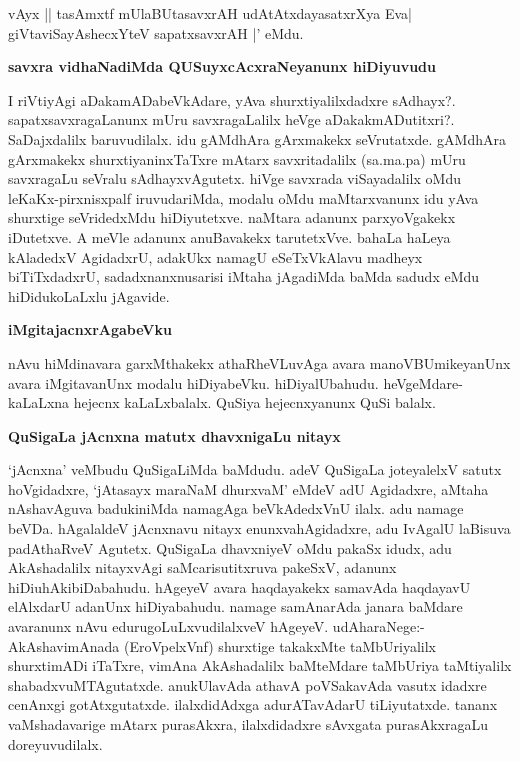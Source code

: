 \begin{shloka}
vAyx || tasAmxtf mUlaBUtasavxrAH udAtAtxdayasatxrXya Eva|\\
giVtaviSayAshecxYteV sapatxsavxrAH |' eMdu.
\end{shloka}

\noindent
\textbf{savxra vidhaNadiMda QUSuyxcAcxraNeyanunx hiDiyuvudu}\label{page122}

I riVtiyAgi aDakamADabeVkAdare, yAva shurxtiyalilxdadxre sAdhayx?. sapatxsavxragaLanunx mUru savxragaLalilx heVge aDakakmADutitxri?. SaDajxdalilx baruvudilalx. idu gAMdhAra gArxmakekx seVrutatxde. gAMdhAra gArxmakekx shurxtiyaninxTaTxre mAtarx savxritadalilx (sa.ma.pa) mUru savxragaLu seVralu sAdhayxvAgutetx. hiVge savxrada viSayadalilx oMdu leKaKx-pirxnisxpalf iruvudariMda, modalu oMdu maMtarxvanunx idu yAva shurxtige seVridedxMdu hiDiyutetxve. naMtara adanunx parxyoVgakekx iDutetxve. A meVle adanunx anuBavakekx tarutetxVve. bahaLa haLeya kAladedxV AgidadxrU, adakUkx namagU eSeTxVkAlavu madheyx biTiTxdadxrU, sadadxnanxnusarisi iMtaha jAgadiMda baMda sadudx eMdu hiDidukoLaLxlu jAgavide.

\noindent
\textbf{iMgitajacnxrAgabeVku}

nAvu hiMdinavara garxMthakekx athaRheVLuvAga avara manoVBUmikeyanUnx avara iMgitavanUnx modalu hiDiyabeVku. hiDiyalUbahudu. heVgeMdare-kaLaLxna hejecnx kaLaLxbalalx. QuSiya hejecnxyanunx QuSi balalx.

\noindent
\textbf{QuSigaLa jAcnxna matutx dhavxnigaLu nitayx}\label{page122}

`jAcnxna' veMbudu QuSigaLiMda baMdudu. adeV QuSigaLa joteyalelxV satutx 
hoVgidadxre, `jAtasayx maraNaM dhurxvaM'\label{122} eMdeV adU Agidadxre, aMtaha nAshavAguva badukiniMda namagAga beVkAdedxVnU ilalx. adu namage beVDa. hAgalaldeV jAcnxnavu nitayx enunxvahAgidadxre, adu IvAgalU laBisuva padAthaRveV Agutetx. QuSigaLa dhavxniyeV oMdu pakaSx idudx, adu AkAshadalilx nitayxvAgi saMcarisutitxruva pakeSxV, adanunx hiDiuhAkibiDabahudu. hAgeyeV avara haqdayakekx samavAda haqdayavU elAlxdarU adanUnx
hiDiyabahudu. namage samAnarAda janara baMdare avaranunx nAvu edurugoLuLxvudilalxveV hAgeyeV. udAharaNege:-AkAshavimAnada (EroVpelxVnf) shurxtige takakxMte taMbUriyalilx shurxtimADi iTaTxre, vimAna AkAshadalilx baMteMdare taMbUriya taMtiyalilx shabadxvuMTAgutatxde. anukUlavAda athavA poVSakavAda vasutx idadxre cenAnxgi gotAtxgutatxde. ilalxdidAdxga adurATavAdarU tiLiyutatxde. tananx vaMshadavarige mAtarx purasAkxra, ilalxdidadxre sAvxgata purasAkxragaLu doreyuvudilalx.

